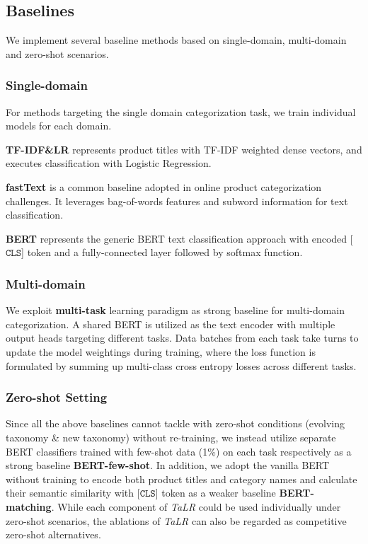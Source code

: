\subsection{Baselines}
\label{sec: baseline}
We implement several baseline methods based on single-domain, multi-domain and zero-shot scenarios.
\subsubsection{Single-domain}
For methods targeting the single domain categorization task, we train individual models for each domain.

\noindent \textbf{TF-IDF\&LR} represents product titles with TF-IDF weighted dense vectors, and executes classification with Logistic Regression.

\noindent \textbf{fastText} \cite{bojanowski2017enriching} is a common baseline adopted in online product categorization challenges. It leverages bag-of-words features and subword information for text classification.

\noindent \textbf{BERT} \cite{devlin-etal-2019-bert} represents the generic BERT text classification approach with encoded [$\mathtt{CLS}$] token and a fully-connected layer followed by softmax function.
\subsubsection{Multi-domain}
We exploit \textbf{multi-task} learning paradigm as strong baseline for multi-domain categorization. A shared BERT is utilized as the text encoder with multiple output heads targeting different tasks. Data batches from each task take turns to update the model weightings during training, where the loss function is formulated by summing up multi-class cross entropy losses across different tasks.
\subsubsection{Zero-shot Setting}
Since all the above baselines cannot tackle with zero-shot conditions (evolving taxonomy  \& new taxonomy) without re-training, we instead utilize separate BERT classifiers trained with few-shot data (1\%) on each task respectively as a strong baseline \textbf{BERT-few-shot}. 
In addition, we adopt the vanilla BERT without training to encode both product titles and category names and calculate their semantic similarity with [$\mathtt{CLS}$] token as a weaker baseline \textbf{BERT-matching}. 
While each component of \textit{TaLR} could be used individually under zero-shot scenarios, the ablations of \textit{TaLR} can also be regarded as competitive zero-shot alternatives. 

